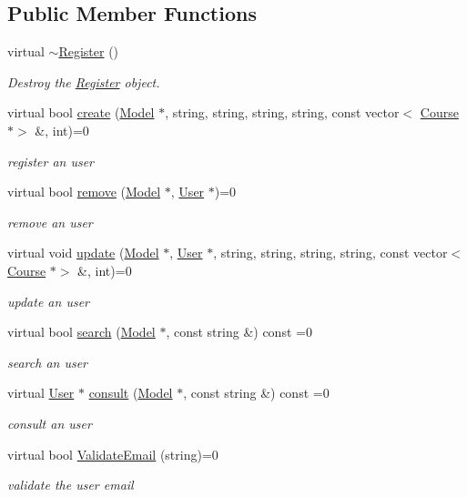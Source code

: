 \subsection*{Public Member Functions}
\begin{DoxyCompactItemize}
\item 
virtual \hyperlink{classRegister_ab0464bc35e0902e33d35fff772548e74}{$\sim$\+Register} ()
\begin{DoxyCompactList}\small\item\em Destroy the \hyperlink{classRegister}{Register} object. \end{DoxyCompactList}\item 
virtual bool \hyperlink{classRegister_acfb8b5ecf7181faff5584765d78ab671}{create} (\hyperlink{classModel}{Model} $\ast$, string, string, string, string, const vector$<$ \hyperlink{classCourse}{Course} $\ast$$>$ \&, int)=0
\begin{DoxyCompactList}\small\item\em register an user \end{DoxyCompactList}\item 
virtual bool \hyperlink{classRegister_a09d7d6c24f7c07e97f7ef2d24a057f73}{remove} (\hyperlink{classModel}{Model} $\ast$, \hyperlink{classUser}{User} $\ast$)=0
\begin{DoxyCompactList}\small\item\em remove an user \end{DoxyCompactList}\item 
virtual void \hyperlink{classRegister_ae1ca8b9044dff27a840a3d26fd5ea323}{update} (\hyperlink{classModel}{Model} $\ast$, \hyperlink{classUser}{User} $\ast$, string, string, string, string, const vector$<$ \hyperlink{classCourse}{Course} $\ast$$>$ \&, int)=0
\begin{DoxyCompactList}\small\item\em update an user \end{DoxyCompactList}\item 
virtual bool \hyperlink{classRegister_a243b58e5f1747437bab5175927cce26f}{search} (\hyperlink{classModel}{Model} $\ast$, const string \&) const =0
\begin{DoxyCompactList}\small\item\em search an user \end{DoxyCompactList}\item 
virtual \hyperlink{classUser}{User} $\ast$ \hyperlink{classRegister_ae1cb0de5f04828c81d2dbad9650e1d6f}{consult} (\hyperlink{classModel}{Model} $\ast$, const string \&) const =0
\begin{DoxyCompactList}\small\item\em consult an user \end{DoxyCompactList}\item 
virtual bool \hyperlink{classRegister_aeeb9ead57f749601459240fc68cfe7b4}{Validate\+Email} (string)=0
\begin{DoxyCompactList}\small\item\em validate the user email \end{DoxyCompactList}\end{DoxyCompactItemize}

